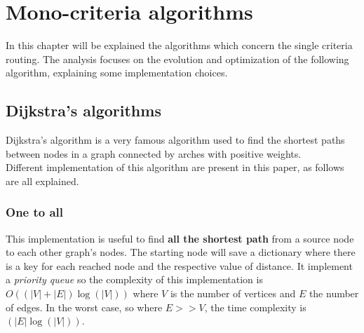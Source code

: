 \documentclass[a4paper,12pt]{report}
\begin{document}




\chapter{Mono-criteria algorithms}

In this chapter will be explained the algorithms which concern the single criteria routing.
The analysis focuses on the evolution and optimization of the following algorithm, explaining some implementation choices.

\section{Dijkstra's algorithms}

Dijkstra's algorithm is a very famous algorithm used to find the shortest paths between nodes in a graph connected by arches with positive weights.\\
Different implementation of this algorithm are present in this paper, as follows are all explained.


\subsection{One to all}
This implementation is useful to find \textbf{all the shortest path} from a source node to each other graph's nodes. The starting node will save a dictionary where there is a key for each reached node and the respective value of distance.
It implement a \textit{priority queue} so the complexity of this implementation is $O((|V|+|E|)\log(|V|))$ where $V$ is the number of vertices and $E$ the number of edges. In the worst case, so where $E>>V$, the time complexity is $(|E|\log(|V|))$.
\end{document}
